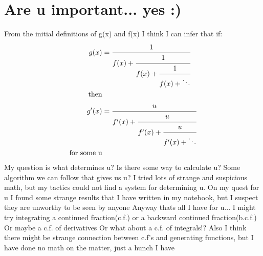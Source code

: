 \documentclass[a4paper]{article}
\begin{document}
\section*{Are u important... yes :)}
From the initial definitions of g(x) and f(x) I think I can infer that if:
\begin{align}
    g(x) &= \cfrac{1}{f(x)+\cfrac{1}{f(x)+\cfrac{1}{f(x)+\ddots}}}\\
    \text{then}\\
    g^\prime(x)&=\cfrac{u}{f^\prime(x)+\cfrac{u}{f^\prime(x)+\cfrac{u}{f^\prime(x) + \ddots}}}\\
    \text{for some u}
\end{align}
My question is what determines u? Is there some way to calculate u? Some algorithm we can follow that gives us u?
I tried lots of strange and suspicious math, but my tactics could not find a system for determining u.
On my quest for u I found some strange results that I have written in my notebook, but I suspect they are unworthy to be seen by anyone
Anyway thats all I have for u... I might try integrating a continued fraction(c.f.) or a backward continued fraction(b.c.f.)
Or maybe a c.f. of derivatives Or what about a c.f. of integrals!?
Also I think there might be strange connection between c.f's and generating functions, but I have done no math on the matter, just a hunch I have
\end{document}
